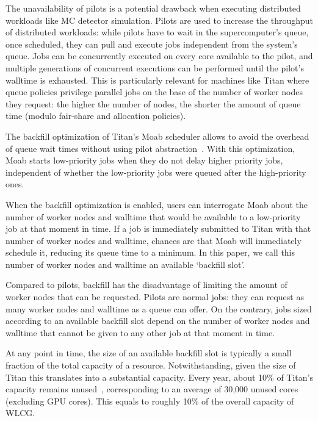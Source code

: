 The unavailability of pilots is a potential drawback when executing
distributed workloads like MC detector simulation. Pilots are used to
increase the throughput of distributed workloads: while pilots have to wait
in the supercomputer's queue, once scheduled, they can pull and execute jobs
independent from the system's queue. Jobs can be concurrently executed on
every core available to the pilot, and multiple generations of concurrent
executions can be performed until the pilot's walltime is exhausted. This is
particularly relevant for machines like Titan where queue policies privilege
parallel jobs on the base of the number of worker nodes they request: the
higher the number of nodes, the shorter the amount of queue time (modulo
fair-share and allocation policies).

The backfill optimization of Titan's Moab scheduler allows to avoid the
overhead of queue wait times without using pilot
abstraction~\cite{maui_backfill_url}. With this optimization, Moab starts
low-priority jobs when they do not delay higher priority jobs, independent of
whether the low-priority jobs were queued after the high-priority ones.

When the backfill optimization is enabled, users can interrogate Moab about
the number of worker nodes and walltime that would be available to a
low-priority job at that moment in time. If a job is immediately submitted to
Titan with that number of worker nodes and walltime, chances are that Moab
will immediately schedule it, reducing its queue time to a minimum. In this
paper, we call this number of worker nodes and walltime an available
`backfill slot'.

Compared to pilots, backfill has the disadvantage of limiting the amount of
worker nodes that can be requested. Pilots are normal jobs: they can request
as many worker nodes and walltime as a queue can offer. On the contrary, jobs
sized according to an available backfill slot depend on the number of worker
nodes and walltime that cannot be given to any other job at that moment in
time.

At any point in time, the size of an available backfill slot is typically a
small fraction of the total capacity of a resource. Notwithstanding, given
the size of Titan this translates into a substantial capacity. Every year,
about 10\% of Titan's capacity remains unused~\cite{barker2016us},
corresponding to an average of 30,000 unused cores (excluding GPU cores).
This equals to roughly 10\% of the overall capacity of WLCG\@.

